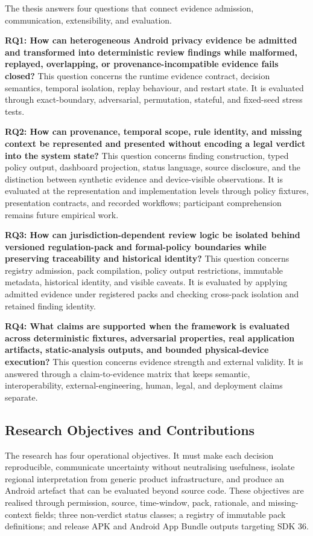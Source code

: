The thesis answers four questions that connect evidence admission, communication, extensibility, and evaluation.

\textbf{RQ1: How can heterogeneous Android privacy evidence be admitted and transformed into deterministic review findings while malformed, replayed, overlapping, or provenance-incompatible evidence fails closed?} This question concerns the runtime evidence contract, decision semantics, temporal isolation, replay behaviour, and restart state. It is evaluated through exact-boundary, adversarial, permutation, stateful, and fixed-seed stress tests.

\textbf{RQ2: How can provenance, temporal scope, rule identity, and missing context be represented and presented without encoding a legal verdict into the system state?} This question concerns finding construction, typed policy output, dashboard projection, status language, source disclosure, and the distinction between synthetic evidence and device-visible observations. It is evaluated at the representation and implementation levels through policy fixtures, presentation contracts, and recorded workflows; participant comprehension remains future empirical work.

\textbf{RQ3: How can jurisdiction-dependent review logic be isolated behind versioned regulation-pack and formal-policy boundaries while preserving traceability and historical identity?} This question concerns registry admission, pack compilation, policy output restrictions, immutable metadata, historical identity, and visible caveats. It is evaluated by applying admitted evidence under registered packs and checking cross-pack isolation and retained finding identity.

\textbf{RQ4: What claims are supported when the framework is evaluated across deterministic fixtures, adversarial properties, real application artifacts, static-analysis outputs, and bounded physical-device execution?} This question concerns evidence strength and external validity. It is answered through a claim-to-evidence matrix that keeps semantic, interoperability, external-engineering, human, legal, and deployment claims separate.

\subsection{Research Objectives and Contributions}

The research has four operational objectives. It must make each decision reproducible, communicate uncertainty without neutralising usefulness, isolate regional interpretation from generic product infrastructure, and produce an Android artefact that can be evaluated beyond source code. These objectives are realised through permission, source, time-window, pack, rationale, and missing-context fields; three non-verdict status classes; a registry of immutable pack definitions; and release APK and Android App Bundle outputs targeting SDK 36.

